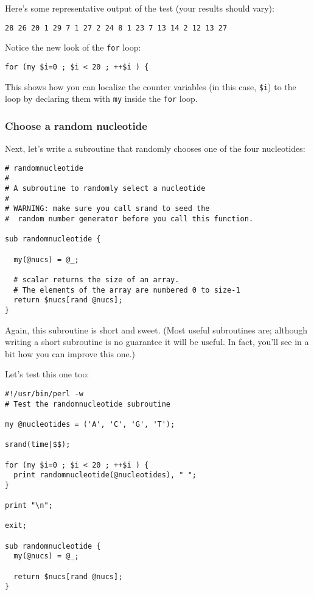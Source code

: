 Here's some representative output of the test (your results should
vary):

\begin{lstlisting}
28 26 20 1 29 7 1 27 2 24 8 1 23 7 13 14 2 12 13 27 
\end{lstlisting}

Notice the new look of the \verb|for| loop:

\begin{lstlisting}
for (my $i=0 ; $i < 20 ; ++$i ) {
\end{lstlisting}

This shows how you can localize the counter variables (in this case, \verb|$i|) to the loop by declaring them with \verb|my| inside the \verb|for| loop.

\subsubsection{Choose a random nucleotide}
Next, let's write a subroutine that randomly chooses one of the four nucleotides: 

\begin{lstlisting}
# randomnucleotide
#
# A subroutine to randomly select a nucleotide
#
# WARNING: make sure you call srand to seed the
#  random number generator before you call this function.

sub randomnucleotide {

  my(@nucs) = @_;

  # scalar returns the size of an array. 
  # The elements of the array are numbered 0 to size-1
  return $nucs[rand @nucs];
}
\end{lstlisting}

Again, this subroutine is short and sweet. (Most useful subroutines are; although writing a short subroutine is no guarantee it will be useful.  In fact, you'll see in a bit how you can improve this one.)

Let's test this one too:

\begin{lstlisting}
#!/usr/bin/perl -w
# Test the randomnucleotide subroutine

my @nucleotides = ('A', 'C', 'G', 'T');

srand(time|$$);

for (my $i=0 ; $i < 20 ; ++$i ) {
  print randomnucleotide(@nucleotides), " ";
}

print "\n";

exit;

sub randomnucleotide {
  my(@nucs) = @_;

  return $nucs[rand @nucs];
}
\end{lstlisting}

